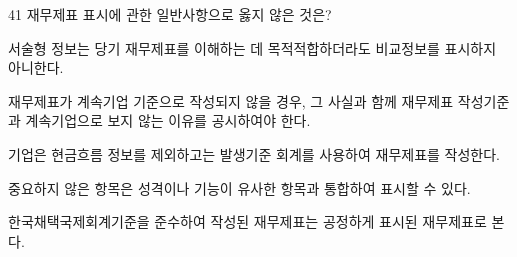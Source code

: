 \begin{question}{41}
재무제표 표시에 관한 일반사항으로 옳지 않은 것은?
\begin{choices}
  \item 서술형 정보는 당기 재무제표를 이해하는 데 목적적합하더라도 비교정보를 표시하지 아니한다.
  \item 재무제표가 계속기업 기준으로 작성되지 않을 경우, 그 사실과 함께 재무제표 작성기준과 계속기업으로 보지 않는 이유를 공시하여야 한다.
  \item 기업은 현금흐름 정보를 제외하고는 발생기준 회계를 사용하여 재무제표를 작성한다.
  \item 중요하지 않은 항목은 성격이나 기능이 유사한 항목과 통합하여 표시할 수 있다.
  \item 한국채택국제회계기준을 준수하여 작성된 재무제표는 공정하게 표시된 재무제표로 본다.
\end{choices}
\end{question}
